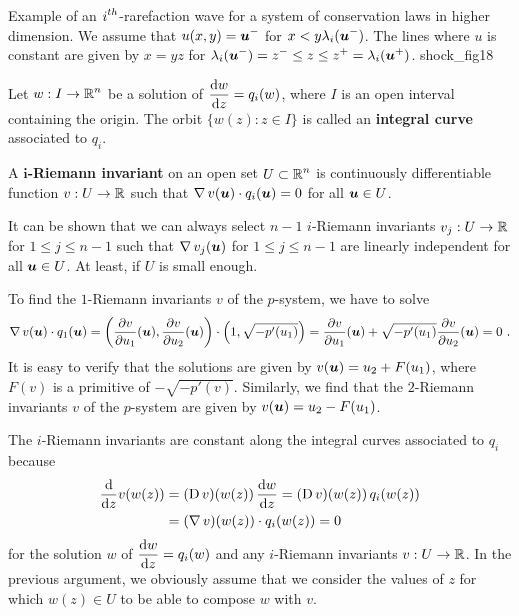 {Example of an $\DS i^{th}$-rarefaction wave for a system of
conservation laws in higher dimension.  We assume that
$\DS u(x,y) = \VEC{u}^-$ for
$\DS x< y \lambda_i(\VEC{u}^-)$.  The lines where $u$
is constant are given by $x= y z$ for $\DS
\lambda_i(\VEC{u}^-) = z^- \leq z \leq z^+ = \lambda_i(\VEC{u}^+)$.}
{shock_fig18}

\begin{defn}
Let $\DS w:I \to \RR^n$ be a solution of
$\DS \dydx{w}{z} = q_i(w)$, where $I$ is an open interval
containing the origin.  The orbit $\{ w(z) : z\in I \}$ is called an
{\bfseries integral curve}
associated to $q_i$.
\end{defn}

\begin{defn}
A {\bfseries $\mathbf{i}$-Riemann invariant} on an open set $\DS U \subset \RR^n$ is
continuously differentiable function $v:U \to \RR$ such that
$\DS \graD v(\VEC{u}) \cdot q_i(\VEC{u}) = 0$
for all $\VEC{u} \in U$.
\end{defn}

It can be shown that we can always select $n-1$ $i$-Riemann invariants
$v_j:U \to \RR$ for $1 \leq j \leq n-1$ such that
$\DS \graD v_j(\VEC{u})$ for $1\leq j\leq n-1$ are linearly
independent for all $\VEC{u} \in U$.  At least, if $U$ is small enough.

\begin{egg}   \label{eggPsystem4}
To find the $1$-Riemann invariants $v$ of the $p$-system, we have to
solve
\[
\graD v(\VEC{u}) \cdot q_1(\VEC{u})
= \left( \pdydx{v}{u_1}(\VEC{u}) , \pdydx{v}{u_2}(\VEC{u}) \right)
\cdot \left( 1 , \sqrt{-p'(u_1)} \right) 
= \pdydx{v}{u_1}(\VEC{u}) + \sqrt{-p'(u_1)} \pdydx{v}{u_2}(\VEC{u}) = 0 \ .
\]
It is easy to verify that the solutions are given by
$v(\VEC{u}) = u_2 + F(u_1)$, where $F(v)$ is a primitive of
$-\sqrt{-p'(v)}$.  Similarly, we find that the $2$-Riemann invariants
$v$ of the $p$-system are given by
$v(\VEC{u}) = u_2 - F(u_1)$.
\end{egg}

The $i$-Riemann invariants are constant along the integral curves
associated to $q_i$ because
\begin{equation} \label{iRiemannInv}
\begin{split}
\dfdx{v(w(z))}{z} &= (\diff v)(w(z)) \, \dydx{w}{z}
= (\diff v)(w(z))\, q_i(w(z)) \\
&= (\graD v)(w(z)) \cdot q_i(w(z)) = 0
\end{split}
\end{equation}
for the solution $w$ of $\DS \dydx{w}{z} = q_i(w)$ and
any $i$-Riemann invariants $v:U \to \RR$.   In the previous argument,
we obviously assume that we consider the values of $z$ for which
$w(z) \in U$ to be able to compose $w$ with $v$.

